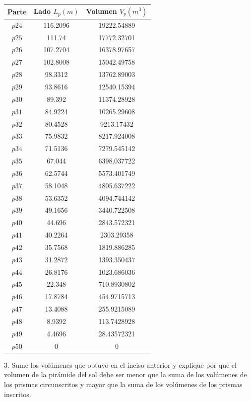 \documentclass[12pt]{article}
\begin{document}
\begin{center}
\begin{tabular}{||c c c||} 
 \hline
 Parte & Lado $L_p (m)$ & Volumen $V_p (m^3)$\\ [0.5ex] 
 \hline\hline
 $p24$	 &	116.2096	 &	19222.54889 \\
 $p25$ 	&	111.74	 &	17772.32701 \\  
$p26$ 	&	107.2704	 &	16378.97657 \\
$p27$	 &	102.8008	 &	15042.49758 \\
$p28$	 &	98.3312	 &	13762.89003 \\
$p29$	 &	93.8616	 &	12540.15394 \\
$p30$	 &	89.392	&	11374.28928 \\
$p31$	 &	84.9224	&	10265.29608  \\
$p32$	 &	80.4528	&	9213.17432 \\
$p33$	 &	75.9832	&	8217.924008  \\
$p34$	 &	71.5136	&	7279.545142 \\
$p35$	 &	67.044	&	6398.037722 \\
$p36$	&	62.5744	&	5573.401749 \\
$p37$	&	58.1048	&	4805.637222 \\
$p38$	&	53.6352	&	4094.744142 \\
$p39$	&	49.1656	&	3440.722508 \\
$p40$	&	44.696	&	2843.572321 \\
$p41$	&	40.2264	&	2303.29358 \\
$p42$	&	35.7568	&	1819.886285 \\
$p43$	&	31.2872	&	1393.350437 \\
$p44$	&	26.8176	&	1023.686036 \\
$p45$	&	22.348	&	710.8930802 \\
$p46$	&	17.8784	&	454.9715713 \\
$p47$	&	13.4088	&	255.9215089 \\
$p48$	&	8.9392	&	113.7428928 \\
$p49$	&	4.4696	&	28.43572321 \\
$p50$	&	0	&	0\\ [1ex] 
\hline
\end{tabular}

\end{center}

3. Sume los volúmenes que obtuvo en el inciso anterior y explique por qué el volumen de la pirámide del sol debe ser menor que la suma de los volúmenes de los prismas circunscritos y mayor que la suma de los volúmenes de los prismas inscritos.\\
\end{document}
